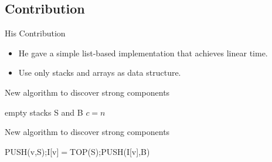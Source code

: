 \documentclass{beamer}
\begin{document}
\subsection{Contribution}

\begin{frame}{His Contribution}%

	\begin{itemize}
		\item
		He gave a simple list-based implementation that achieves linear time.
		\item
		Use only stacks and arrays as data structure. %
	\end{itemize}
\end{frame}

\begin{frame}[fragile]{New algorithm to discover strong components}
	\begin{procedure}[H]
		\small
		\caption{STRONG(G)}
		empty stacks S and B\;
		$c=n$\;
	\end{procedure}
\end{frame}

\begin{frame}[fragile]{New algorithm to discover strong components}
	\begin{procedure}[H]
		\scriptsize
		\caption{DFS(v)}
		PUSH(v,S);\quad I[v]$=$TOP(S);\quad PUSH(I[v],B)\;
	\end{procedure}
\end{frame}
\end{document}
